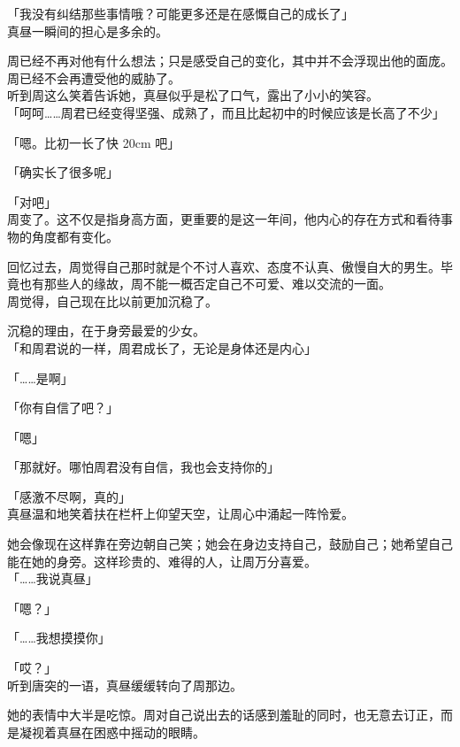 「我没有纠结那些事情哦？可能更多还是在感慨自己的成长了」\\

真昼一瞬间的担心是多余的。

周已经不再对他有什么想法；只是感受自己的变化，其中并不会浮现出他的面庞。周已经不会再遭受他的威胁了。\\

听到周这么笑着告诉她，真昼似乎是松了口气，露出了小小的笑容。\\

「呵呵……周君已经变得坚强、成熟了，而且比起初中的时候应该是长高了不少」

「嗯。比初一长了快 20cm 吧」

「确实长了很多呢」

「对吧」\\

周变了。这不仅是指身高方面，更重要的是这一年间，他内心的存在方式和看待事物的角度都有变化。

回忆过去，周觉得自己那时就是个不讨人喜欢、态度不认真、傲慢自大的男生。毕竟也有那些人的缘故，周不能一概否定自己不可爱、难以交流的一面。\\

周觉得，自己现在比以前更加沉稳了。

沉稳的理由，在于身旁最爱的少女。\\

「和周君说的一样，周君成长了，无论是身体还是内心」

「……是啊」

「你有自信了吧？」

「嗯」

「那就好。哪怕周君没有自信，我也会支持你的」

「感激不尽啊，真的」\\

真昼温和地笑着扶在栏杆上仰望天空，让周心中涌起一阵怜爱。

她会像现在这样靠在旁边朝自己笑；她会在身边支持自己，鼓励自己；她希望自己能在她的身旁。这样珍贵的、难得的人，让周万分喜爱。\\

「……我说真昼」

「嗯？」

「……我想摸摸你」

「哎？」\\

听到唐突的一语，真昼缓缓转向了周那边。

她的表情中大半是吃惊。周对自己说出去的话感到羞耻的同时，也无意去订正，而是凝视着真昼在困惑中摇动的眼睛。\\

